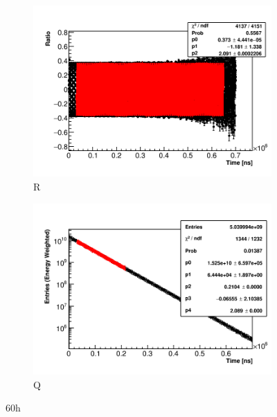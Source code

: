 \begin{figure}[]
    \begin{subfigure}[t]{0.45\textwidth}
        \centering
        \includegraphics[width=\textwidth]{Example_RMethod_Fit}
        \caption{R}
    \end{subfigure}
    \hspace{1mm}
    \begin{subfigure}[t]{0.45\textwidth}
        \centering
        \includegraphics[width=\textwidth]{Example_QMethod_Fit}
        \caption{Q}
    \end{subfigure}
\caption[]{60h}
\label{fig:}
\end{figure}


